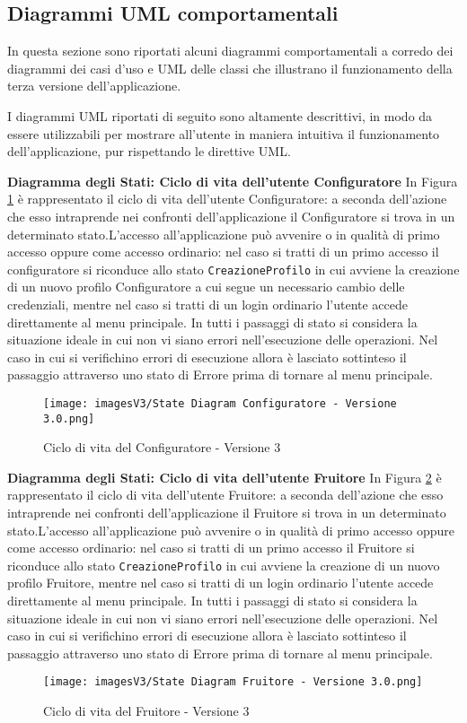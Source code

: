\newpage
\subsection{Diagrammi UML comportamentali}
In questa sezione sono riportati alcuni diagrammi comportamentali a corredo dei diagrammi dei casi d'uso e UML delle classi che illustrano il funzionamento della terza versione dell'applicazione.

I diagrammi UML riportati di seguito sono altamente descrittivi, in modo da essere utilizzabili per mostrare all'utente in maniera intuitiva il funzionamento dell'applicazione, pur rispettando le direttive UML.\bigskip

\textbf{Diagramma degli Stati: Ciclo di vita dell'utente Configuratore}\newline
In Figura \ref{fig:State diagram 3.1} è rappresentato il ciclo di vita dell'utente Configuratore: a seconda dell'azione che esso intraprende nei confronti dell'applicazione il Configuratore si trova in un determinato stato.\newline L'accesso all'applicazione può avvenire o in qualità di primo accesso oppure come accesso ordinario: nel caso si tratti di un primo accesso il configuratore si riconduce allo stato \texttt{CreazioneProfilo} in cui avviene la creazione di un nuovo profilo Configuratore a cui segue un necessario cambio delle credenziali, mentre nel caso si tratti di un login ordinario l'utente accede direttamente al menu principale. \newline 
In tutti i passaggi di stato si considera la situazione ideale in cui non vi siano errori nell'esecuzione delle operazioni. Nel caso in cui si verifichino errori di esecuzione allora è lasciato sottinteso il passaggio attraverso uno stato di Errore prima di tornare al menu principale.

\begin{figure}[ht]
\centering
\texttt{[image: imagesV3/State Diagram Configuratore - Versione 3.0.png]}
\caption{\label{fig:State diagram 3.1}Ciclo di vita del Configuratore - Versione 3}
\end{figure}\bigskip

\textbf{Diagramma degli Stati: Ciclo di vita dell'utente Fruitore}\newline
In Figura \ref{fig:State diagram 3.2} è rappresentato il ciclo di vita dell'utente Fruitore: a seconda dell'azione che esso intraprende nei confronti dell'applicazione il Fruitore si trova in un determinato stato.\newline L'accesso all'applicazione può avvenire o in qualità di primo accesso oppure come accesso ordinario: nel caso si tratti di un primo accesso il Fruitore si riconduce allo stato \texttt{CreazioneProfilo} in cui avviene la creazione di un nuovo profilo Fruitore, mentre nel caso si tratti di un login ordinario l'utente accede direttamente al menu principale. \newline 
In tutti i passaggi di stato si considera la situazione ideale in cui non vi siano errori nell'esecuzione delle operazioni. Nel caso in cui si verifichino errori di esecuzione allora è lasciato sottinteso il passaggio attraverso uno stato di Errore prima di tornare al menu principale.

\begin{figure}[t!]
\centering
\texttt{[image: imagesV3/State Diagram Fruitore - Versione 3.0.png]}
\caption{\label{fig:State diagram 3.2}Ciclo di vita del Fruitore - Versione 3}
\end{figure}\bigskip